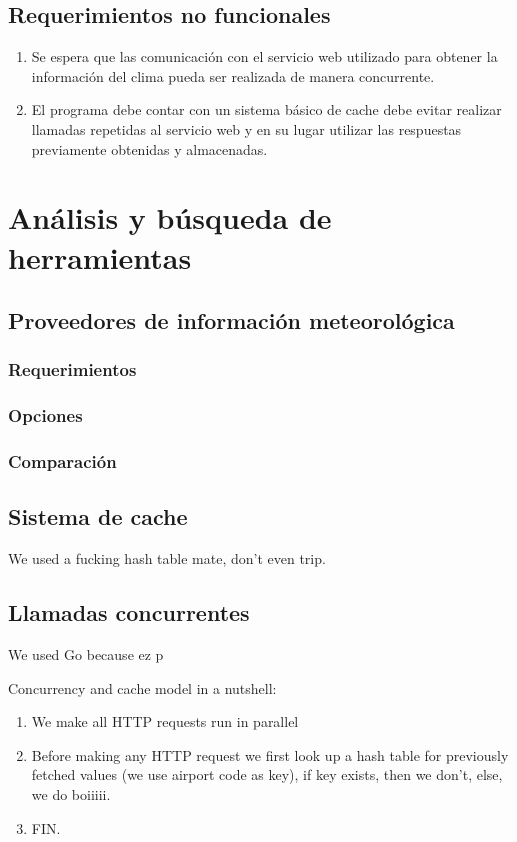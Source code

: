 \documentclass[10pt, letterpaper]{article}
\begin{document}
\subsection{Requerimientos no funcionales}

\begin{enumerate}
  \item Se espera que las comunicación con el servicio web utilizado para obtener la información del
  clima pueda ser realizada de manera concurrente.
  \item El programa debe contar con un sistema básico de cache debe evitar realizar llamadas
  repetidas al servicio web y en su lugar utilizar las respuestas previamente obtenidas y
  almacenadas. 
\end{enumerate}

\section{Análisis y búsqueda de herramientas}
\subsection{Proveedores de información meteorológica}
\subsubsection{Requerimientos}
\subsubsection{Opciones}
\subsubsection{Comparación}
\subsection{Sistema de cache}
We used a fucking hash table mate, don't even trip.
\subsection{Llamadas concurrentes}
We used Go because ez p

Concurrency and cache model in a nutshell:
\begin{enumerate}
  \item We make all HTTP requests run in parallel
  \item Before making any HTTP request we first look up a hash table for previously fetched values (we use airport code as key), if key exists, then we don't, else, we do boiiiii.
  \item FIN.
\end{enumerate}
\end{document}
